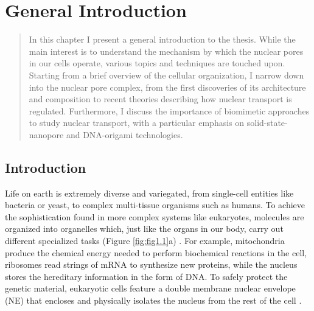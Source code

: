 \chapter[General Introduction]{General Introduction}
\label{chapter_1}

%
%
%

\begin{abstract}
	In this chapter I present a general introduction to the thesis. While the main interest is to understand the mechanism by which the nuclear pores in our cells operate, various topics and techniques are touched upon. Starting from a brief overview of the cellular organization, I narrow down into the nuclear pore complex, from the first discoveries of its architecture and composition to recent theories describing how nuclear transport is regulated. Furthermore, I discuss the importance of biomimetic approaches to study nuclear transport, with a particular emphasis on solid-state-nanopore and DNA-origami technologies.
\end{abstract}


\newpage
\section[Introduction]{Introduction}
Life on earth is extremely diverse and variegated, from single-cell entities like  bacteria or yeast, to complex multi-tissue organisms such as humans. To achieve the sophistication found in more complex systems like eukaryotes, molecules are organized into organelles which, just like the organs in our body, carry out different specialized tasks (Figure \ref{fig:fig1.1}a) \cite{Lodish2000}. For example, mitochondria produce the chemical energy needed to perform biochemical reactions in the cell, ribosomes read strings of mRNA to synthesize new proteins, while the nucleus stores the hereditary information in the form of DNA\cite{Nelson2008}. To safely protect the genetic material, eukaryotic cells feature a double membrane nuclear envelope (NE) that encloses and physically isolates the nucleus from the rest of the cell \cite{Hetzer2010}.

